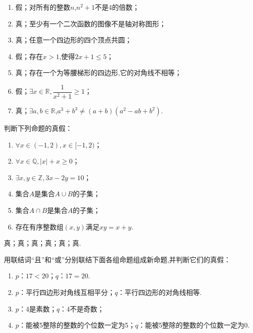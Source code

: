 \documentclass[lang=cn,newtx,10pt,scheme=chinese]{elegantbook}
\begin{document}
\begin{solution}
  
\end{solution}

\begin{enumerate}
  \item 假；对所有的整数$n$,$n^2+1$不是4的倍数；
  \item 真；至少有一个二次函数的图像不是轴对称图形；
  \item 真；任意一个四边形的四个顶点共圆；
  \item 假；存在$x>1$,使得$2x+1\leqslant 5$；
  \item 真；存在一个为等腰梯形的四边形,它的对角线不相等；
  \item 假；$\exists x\in\mathbb{R},\dfrac1{x^2+1}\geqslant 1$；
  \item 真；$\exists a,b{\in}\mathbb{R}$,$a^3+b^3\neq(a+b)(a^2-ab+b^2)$.
\end{enumerate}

\begin{exercise}
  判断下列命题的真假：
\end{exercise}

\begin{enumerate}
  \item $\forall x\in(-1, 2), x\in[-1, 2)$；
  \item $\forall x\in\mathbb{Q}, |x|+x\geqslant0$；
  \item $\exists x,y\in\mathbb{Z},3x-2y=10$；
  \item 集合$A$是集合$A\cup B$的子集；
  \item 集合$A\cap B$是集合$A$的子集；
  \item 存在有序整数组$(x,y)$满足$xy=x+y$.
\end{enumerate}

\begin{solution}
  真；真；真；真；真；真.
\end{solution}

\begin{exercise}
  用联结词“且”和“或”分别联结下面各组命题组成新命题,并判断它们的真假：
\end{exercise}

\begin{enumerate}
  \item $p$：$17<20$；$q$：$17=20$.
  \item $p$：平行四边形对角线互相平分；$q$：平行四边形的对角线相等.
  \item $p$：4是素数；$q$：4不是奇数；
  \item $p$：能被5整除的整数的个位数一定为5；$q$：能被5整除的整数的个位数一定为0.
\end{enumerate}
\end{document}
